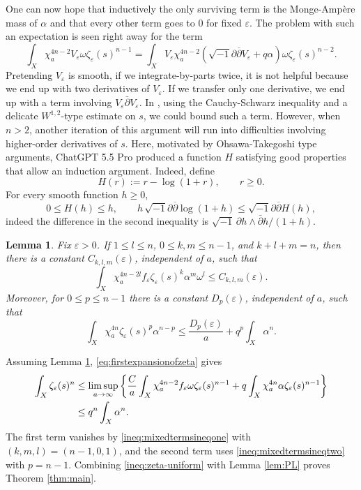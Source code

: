 \documentclass[11pt]{amsart}
\numberwithin{equation}{section}
\newcommand{\vep}{\varepsilon}
\renewcommand{\d}{\partial}
\newcommand{\ddbar}{\sqrt{-1}\d\overline{\d}}
\theoremstyle{plain}
\newtheorem{lemma}[theorem]{Lemma}
\theoremstyle{remark}
\begin{document}
One can now hope that inductively the only surviving term is the Monge-Amp\`ere mass of $\alpha$ and that every other term goes to $0$ for fixed $\vep$. The problem with such an expectation is seen right away for the term $$\displaystyle \int_X \chi_a^{4n-2} V_{\vep} \omega \zeta_\vep(s)^{n-1}=\int_X V_{\vep} \chi_a^{4n-2} (\ddbar V_{\vep}+q\alpha)  \omega \zeta_\vep(s)^{n-2}.$$
Pretending $V_{\vep}$ is smooth, if we integrate-by-parts twice, it is not helpful because we end up with two derivatives of $V_{\vep}$. If we transfer only one derivative, we end up with a term involving $V_{\vep} \bar{\partial} V_{\vep}$. In \cite{DPS}, using the Cauchy-Schwarz inequality and a delicate $W^{1,2}$-type estimate on $s$, we could bound such a term. However, when $n>2$, another iteration of this argument will run into difficulties involving higher-order derivatives of $s$. Here, motivated by Ohsawa-Takegoshi type arguments, ChatGPT 5.5 Pro produced a function $H$ satisfying good properties that allow an induction argument. Indeed, define
\begin{equation}\label{def:Hep}
        H(r):=r-\log(1+r),\qquad r\ge0 .
\end{equation}
For every smooth function $h\ge0$,
\begin{equation}\label{ineq:propsofHep}
        0\leq H(h)\leq h,
        \qquad
        h\,\ddbar\log(1+h)\leq\ddbar H(h),
\end{equation}
indeed the difference in the second inequality is
$\sqrt{-1}\,\partial h\wedge\bar\partial h/(1+h)$.

\begin{lemma}\label{lem:mixedterms}
Fix $\vep>0$.  If $1\leq l\leq n$, $0\leq k,m\leq n-1$, and $k+l+m=n$, then there is a constant $C_{k,l,m}(\vep)$, independent of $a$, such that
\begin{equation}\label{ineq:mixedtermsineqone}
\int_X\chi_a^{4n-2l}f_\vep\zeta_\vep(s)^k\alpha^m\omega^l
\leq C_{k,l,m}(\vep).
\end{equation}
Moreover, for $0\leq p\leq n-1$ there is a constant $D_p(\vep)$, independent of $a$, such that
\begin{equation}\label{ineq:mixedtermsineqtwo}
\int_X\chi_a^{4n}\zeta_\vep(s)^p\alpha^{n-p}
\leq \frac{D_p(\vep)}{a}+q^p\int_X\alpha^n .
\end{equation}
\end{lemma}

Assuming Lemma \ref{lem:mixedterms}, \eqref{eq:firstexpansionofzeta} gives
\begin{align}
\int_X\zeta_\vep(s)^n
&\leq
\limsup_{a\to\infty}\left\{
\frac{C}{a}\int_X\chi_a^{4n-2}f_\vep\omega\zeta_\vep(s)^{n-1}
+q\int_X\chi_a^{4n}\alpha\zeta_\vep(s)^{n-1}\right\}       \notag\\
&\leq q^n\int_X\alpha^n .\label{ineq:zeta-uniform}
\end{align}
The first term vanishes by \eqref{ineq:mixedtermsineqone} with $(k,m,l)=(n-1,0,1)$, and the second term uses \eqref{ineq:mixedtermsineqtwo} with $p=n-1$.  Combining \eqref{ineq:zeta-uniform} with Lemma \ref{lem:PL} proves Theorem \ref{thm:main}.
\end{document}
